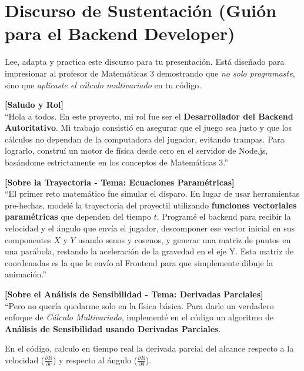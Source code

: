\documentclass[12pt,a4paper]{article}
\begin{document}
\section{Discurso de Sustentación (Guión para el Backend Developer)}

\begin{tcolorbox}[colback=blue!5!white,colframe=blue!75!black,title=\textbf{Instrucciones para el estudiante}]
Lee, adapta y practica este discurso para tu presentación. Está diseñado para impresionar al profesor de Matemáticas 3 demostrando que \textit{no solo programaste}, sino que \textit{aplicaste el cálculo multivariado} en tu código.
\end{tcolorbox}

\textbf{[Saludo y Rol]} \\
``Hola a todos. En este proyecto, mi rol fue ser el \textbf{Desarrollador del Backend Autoritativo}. Mi trabajo consistió en asegurar que el juego sea justo y que los cálculos no dependan de la computadora del jugador, evitando trampas. Para lograrlo, construí un motor de física desde cero en el servidor de Node.js, basándome estrictamente en los conceptos de Matemáticas 3.''

\vspace{0.5cm}
\textbf{[Sobre la Trayectoria - Tema: Ecuaciones Paramétricas]} \\
``El primer reto matemático fue simular el disparo. En lugar de usar herramientas pre-hechas, modelé la trayectoria del proyectil utilizando \textbf{funciones vectoriales paramétricas} que dependen del tiempo $t$. Programé el backend para recibir la velocidad y el ángulo que envía el jugador, descomponer ese vector inicial en sus componentes $X$ y $Y$ usando senos y cosenos, y generar una matriz de puntos en una parábola, restando la aceleración de la gravedad en el eje Y. Esta matriz de coordenadas es la que le envío al Frontend para que simplemente dibuje la animación.''

\vspace{0.5cm}
\textbf{[Sobre el Análisis de Sensibilidad - Tema: Derivadas Parciales]} \\
``Pero no quería quedarme solo en la física básica. Para darle un verdadero enfoque de \textit{Cálculo Multivariado}, implementé en el código un algoritmo de \textbf{Análisis de Sensibilidad usando Derivadas Parciales}. 

En el código, calculo en tiempo real la derivada parcial del alcance respecto a la velocidad ($\frac{\partial R}{\partial v}$) y respecto al ángulo ($\frac{\partial R}{\partial \theta}$). 
\end{document}
